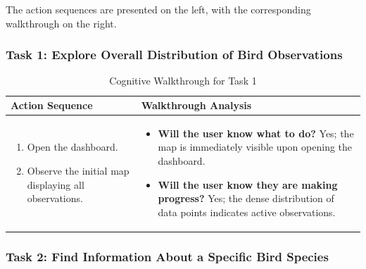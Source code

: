 The action sequences are presented on the left, with the corresponding walkthrough on the right.

\subsubsection{Task 1: Explore Overall Distribution of Bird Observations}

\begin{table}[H]
    \centering
    \begin{tabular}{p{} | p{}}
        \hline
        \textbf{Action Sequence} & \textbf{Walkthrough Analysis} \\
        \hline
        \begin{enumerate}
            \item Open the dashboard.
            \item Observe the initial map displaying all observations.
        \end{enumerate} &
        \begin{itemize}
            \item \textbf{Will the user know what to do?} Yes; the map is immediately visible upon opening the dashboard.
            \item \textbf{Will the user know they are making progress?} Yes; the dense distribution of data points indicates active observations.
        \end{itemize} \\
        \hline
    \end{tabular}
    \caption{Cognitive Walkthrough for Task 1}
    \label{tab:task1_walkthrough}
\end{table}

\subsubsection{Task 2: Find Information About a Specific Bird Species}

